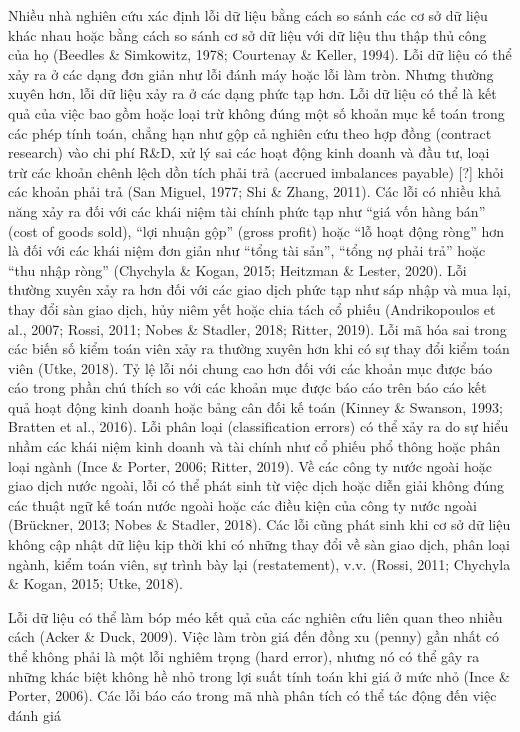 Nhiều nhà nghiên cứu xác định lỗi dữ liệu bằng cách so sánh các cơ sở dữ liệu khác nhau hoặc bằng cách so sánh cơ sở dữ liệu với dữ liệu thu thập thủ công của họ (Beedles \& Simkowitz, 1978; Courtenay \& Keller, 1994). Lỗi dữ liệu có thể xảy ra ở các dạng đơn giản như lỗi đánh máy hoặc lỗi làm tròn. Nhưng thường xuyên hơn, lỗi dữ liệu xảy ra ở các dạng phức tạp hơn. Lỗi dữ liệu có thể là kết quả của việc bao gồm hoặc loại trừ không đúng một số khoản mục kế toán trong các phép tính toán, chẳng hạn như gộp cả nghiên cứu theo hợp đồng (contract research) vào chi phí R\&D, xử lý sai các hoạt động kinh doanh và đầu tư, loại trừ các khoản chênh lệch dồn tích phải trả (accrued imbalances payable) [?] khỏi các khoản phải trả (San Miguel, 1977; Shi \& Zhang, 2011). Các lỗi có nhiều khả năng xảy ra đối với các khái niệm tài chính phức tạp như ``giá vốn hàng bán'' (cost of goods sold), ``lợi nhuận gộp'' (gross profit) hoặc ``lỗ hoạt động ròng'' hơn là đối với các khái niệm đơn giản như ``tổng tài sản'', ``tổng nợ phải trả'' hoặc ``thu nhập ròng'' (Chychyla \& Kogan, 2015; Heitzman \& Lester, 2020). Lỗi thường xuyên xảy ra hơn đối với các giao dịch phức tạp như sáp nhập và mua lại, thay đổi sàn giao dịch, hủy niêm yết hoặc chia tách cổ phiếu (Andrikopoulos et al., 2007; Rossi, 2011; Nobes \& Stadler, 2018; Ritter, 2019). Lỗi mã hóa sai trong các biến số kiểm toán viên xảy ra thường xuyên hơn khi có sự thay đổi kiểm toán viên (Utke, 2018). Tỷ lệ lỗi nói chung cao hơn đối với các khoản mục được báo cáo trong phần chú thích so với các khoản mục được báo cáo trên báo cáo kết quả hoạt động kinh doanh hoặc bảng cân đối kế toán (Kinney \& Swanson, 1993; Bratten et al., 2016). Lỗi phân loại (classification errors) có thể xảy ra do sự hiểu nhầm các khái niệm kinh doanh và tài chính như cổ phiếu phổ thông hoặc phân loại ngành (Ince \& Porter, 2006; Ritter, 2019). Về các công ty nước ngoài hoặc giao dịch nước ngoài, lỗi có thể phát sinh từ việc dịch hoặc diễn giải không đúng các thuật ngữ kế toán nước ngoài hoặc các điều kiện của công ty nước ngoài (Brückner, 2013; Nobes \& Stadler, 2018). Các lỗi cũng phát sinh khi cơ sở dữ liệu không cập nhật dữ liệu kịp thời khi có những thay đổi về sàn giao dịch, phân loại ngành, kiểm toán viên, sự trình bày lại (restatement), v.v. (Rossi, 2011; Chychyla \& Kogan, 2015; Utke, 2018).

Lỗi dữ liệu có thể làm bóp méo kết quả của các nghiên cứu liên quan theo nhiều cách (Acker \& Duck, 2009). Việc làm tròn giá đến đồng xu (penny) gần nhất có thể không phải là một lỗi nghiêm trọng (hard error), nhưng nó có thể gây ra những khác biệt không hề nhỏ trong lợi suất tính toán khi giá ở mức nhỏ (Ince \& Porter, 2006). Các lỗi báo cáo trong mã nhà phân tích có thể tác động đến việc đánh giá

